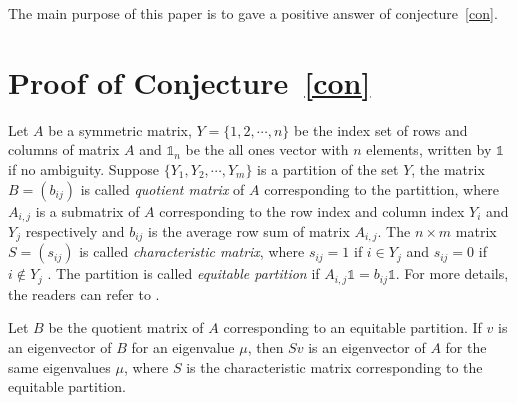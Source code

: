 \documentclass[10pt]{article}
\begin{document}
     The main purpose of this paper is to gave a positive answer of conjecture~\ref{con}.



\section{Proof of Conjecture~\ref{con}}
Let $A$ be a symmetric matrix, $Y=\{1,2,\cdots,n\}$ be the index set of rows and columns of matrix $A$ and $\mathbb{1}_n$ be the all ones vector with $n$ elements, written by $\mathbb{1}$ if no ambiguity. Suppose $\{Y_1,Y_2,\cdots,Y_m\}$ is a partition of the set $Y$, the matrix $B=(b_{ij})$ is called {\it quotient matrix} of $A$ corresponding to the partittion, where $A_{i,j}$ is a submatrix of $A$ corresponding to the row index and column index $Y_i$ and $Y_j$ respectively and $b_{ij}$ is the average row sum of matrix $A_{i,j}$. The $n\times m$ matrix $S=(s_{ij})$ is called {\it characteristic matrix}, where $s_{ij}=1$ if $i\in Y_{j}$ and $s_{ij}=0$ if $i\notin Y_{j}$ . The partition is called {\it equitable partition} if $A_{i,j}\mathbb{1}=b_{ij}\mathbb{1}$. For more details, the readers can refer to \cite{Brouwer}.
\begin{lemma}\label{Eq-P}\cite{Brouwer} Let $B$ be the quotient matrix of $A$ corresponding to an equitable partition. If $v$ is an eigenvector of $B$ for an eigenvalue $\mu$, then $Sv$ is an eigenvector of $A$ for the same eigenvalues $\mu$, where $S$ is the characteristic matrix corresponding to the equitable partition.
\end{lemma}
\end{document}
